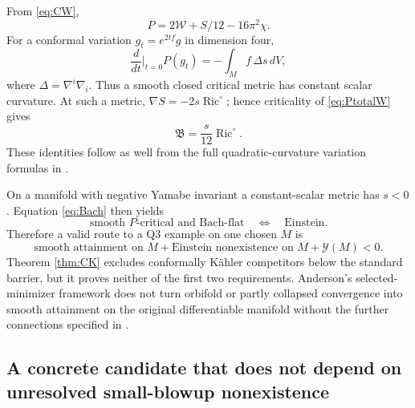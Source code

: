 \documentclass[11pt,a4paper]{article}
\numberwithin{equation}{section}
\theoremstyle{definition}\newtheorem{hypothesis}[theorem]{Input}
\theoremstyle{remark}\newtheorem{remark}[theorem]{Remark}
\newcommand{\Ric}{\operatorname{Ric}}
\begin{document}
From \eqref{eq:CW},
\begin{equation}\label{eq:PtotalW}
 P=2\mathcal W+S/12-16\pi^2\chi.
\end{equation}
For a conformal variation $g_t=e^{2tf}g$ in dimension four,
\begin{equation}\label{eq:conformalP}
 \frac{d}{dt}\bigg|_{t=0}P(g_t)=-\int_M f\,\Delta s\,dV,
\end{equation}
where $\Delta=\nabla^i\nabla_i$.  Thus a smooth closed critical metric has
constant scalar curvature.  At such a metric,
$\nabla S=-2s\Ric^\circ$; hence criticality of \eqref{eq:PtotalW} gives
\begin{equation}\label{eq:Bach}
 \boxed{\mathfrak B=\frac{s}{12}\Ric^\circ.}
\end{equation}
These identities follow as well from the full quadratic-curvature
variation formulas in \cite[Section 2]{GV}.

On a manifold with negative Yamabe invariant a constant-scalar metric has
$s<0$.  Equation \eqref{eq:Bach} then yields
\begin{equation}
 \text{smooth $P$-critical and Bach-flat}\quad\Longleftrightarrow\quad
 \text{Einstein}.
\end{equation}
Therefore a valid route to a Q3 example on one chosen $M$ is
\[
 \text{smooth attainment on $M$}
 +\text{Einstein nonexistence on $M$}
 +\mathcal Y(M)<0.
\]
Theorem \ref{thm:CK} excludes conformally K\"ahler competitors below the
standard barrier, but it proves neither of the first two requirements.
Anderson's selected-minimizer framework \cite{Anderson} does not turn
orbifold or partly collapsed convergence into smooth attainment on the
original differentiable manifold without the further connections specified
in \cite[Section 4]{Synthesis}.


\subsection{A concrete candidate that does not depend on unresolved small-blowup nonexistence}
\end{document}
